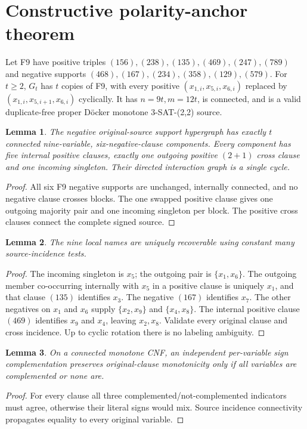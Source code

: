 \documentclass[11pt]{article}
\newtheorem{lemma}{Lemma}
\begin{document}
\section{Constructive polarity-anchor theorem}
Let F9 have positive triples $(156),(238),(135),(469),(247),(789)$ and negative supports $(468),(167),(234),(358),(129),(579)$. For $t\ge2$, $G_t$ has $t$ copies of F9, with every positive $(x_{1,i},x_{5,i},x_{6,i})$ replaced by $(x_{1,i},x_{5,i+1},x_{6,i})$ cyclically. It has $n=9t,m=12t$, is connected, and is a valid duplicate-free proper D\"ocker monotone 3-SAT-(2,2) source.
\begin{lemma}
The negative original-source support hypergraph has exactly $t$ connected nine-variable, six-negative-clause components. Every component has five internal positive clauses, exactly one outgoing positive $(2+1)$ cross clause and one incoming singleton. Their directed interaction graph is a single cycle.
\end{lemma}
\begin{proof}
All six F9 negative supports are unchanged, internally connected, and no negative clause crosses blocks. The one swapped positive clause gives one outgoing majority pair and one incoming singleton per block. The positive cross clauses connect the complete signed source. 
\end{proof}
\begin{lemma}
The nine local names are uniquely recoverable using constant many source-incidence tests.
\end{lemma}
\begin{proof}
The incoming singleton is $x_5$; the outgoing pair is $\{x_1,x_6\}$. The outgoing member co-occurring internally with $x_5$ in a positive clause is uniquely $x_1$, and that clause $(135)$ identifies $x_3$. The negative $(167)$ identifies $x_7$. The other negatives on $x_1$ and $x_6$ supply $\{x_2,x_9\}$ and $\{x_4,x_8\}$. The internal positive clause $(469)$ identifies $x_9$ and $x_4$, leaving $x_2,x_8$. Validate every original clause and cross incidence. Up to cyclic rotation there is no labeling ambiguity.
\end{proof}
\begin{lemma}
On a connected monotone CNF, an independent per-variable sign complementation preserves original-clause monotonicity only if all variables are complemented or none are.
\end{lemma}
\begin{proof}
For every clause all three complemented/not-complemented indicators must agree, otherwise their literal signs would mix. Source incidence connectivity propagates equality to every original variable.
\end{proof}
\end{document}
